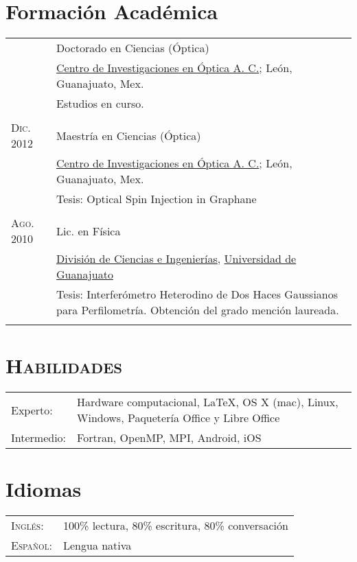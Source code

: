 \documentclass[letterpaper,10pt]{article}
\begin{document}
\section{Formaci\'on Acad\'emica}
\begin{tabular}{R{4cm}|p{11cm}}
					&	Doctorado en Ciencias (\'Optica) \\
					&	\href{http://www.cio.mx/}{Centro de Investigaciones en \'Optica A. C.}; Le\'on, Guanajuato, Mex.\\
					&	Estudios en curso.\\
					 \\

\textsc{Dic. 2012 }	&	Maestr\'ia en Ciencias (\'Optica) \\
					&	\href{http://www.cio.mx/}{Centro de Investigaciones en \'Optica A. C.}; Le\'on, Guanajuato, Mex.\\
					&	Tesis: Optical Spin Injection in Graphane\\
					 \\

\textsc{Ago. 2010 }	&	Lic. en F\'isica \\
					&	\href{https://fisica.ugto.mx}{Divisi\'on de Ciencias e Ingenier\'ias}, \href{http://www.ugto.mx}{Universidad de Guanajuato}\\
					&	Tesis: Interfer\'ometro Heterodino de Dos Haces Gaussianos para Perfilometr\'ia. Obtenci\'on del grado menci\'on laureada.\\
					 \\
\end{tabular}

\newpage
\section{\textsc{Habilidades}}
	\begin{tabular}{R{4cm} p{10cm}}
		Experto:	&	Hardware computacional, \LaTeX, OS X (mac), Linux, Windows, Paquetería Office y Libre Office\\ 
		Intermedio:	&	Fortran, OpenMP, MPI, Android, iOS\\
	\end{tabular}

\section{Idiomas}
	\begin{tabular}{R{4cm}l}
		\textsc{Ingl\'es}:	&	100\% lectura, 80\% escritura, 80\% conversación \\
		\textsc{Espa\~nol}:	&	Lengua nativa \\
	\end{tabular}
\end{document}
